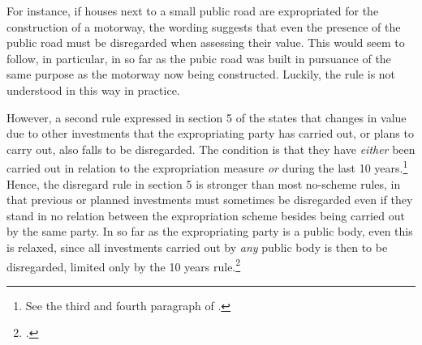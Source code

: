 For instance, if houses next to a small public road are expropriated for the construction of a motorway, the wording suggests that even the presence of the public road must be disregarded when assessing their value. This would seem to follow, in particular, in so far as the pubic road was built in pursuance of the same purpose as the motorway now being constructed. Luckily, the rule is not understood in this way in practice. 

However, a second rule expressed in section 5 of the \cite{ca84} states that changes in value due to other investments that the expropriating party has carried out, or plans to carry out, also falls to be disregarded. The condition is that they have {\it either} been carried out in relation to the expropriation measure {\it or} during the last 10 years.\footnote{See the third and fourth paragraph of \cite[5]{ca84}.} Hence, the disregard rule in section 5 is stronger than most no-scheme rules, in that previous or planned investments must sometimes be disregarded even if they stand in no relation between the expropriation scheme besides being carried out by the same party. In so far as the expropriating party is a public body, even this is relaxed, since all investments carried out by {\it any} public body is then to be disregarded, limited only by the 10 years rule.\footcite[5]{ca84} 

